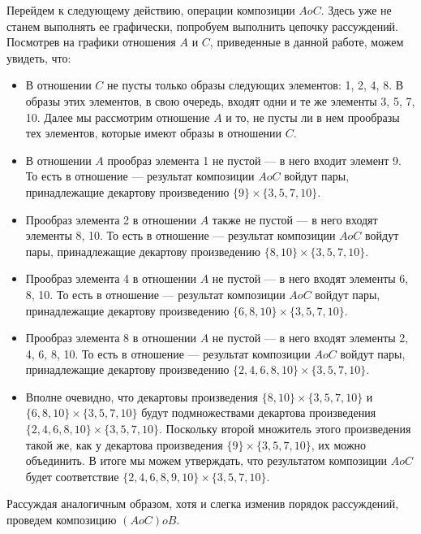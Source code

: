 \documentclass[12pt]{article}
\begin{document}
	Перейдем к следующему действию, операции композиции $A o C$. Здесь уже не станем выполнять ее графически, попробуем выполнить цепочку рассуждений. Посмотрев на графики отношения $A$ и $C$, приведенные в данной работе, можем увидеть, что:
	\begin{itemize}
		\item{В отношении $C$ не пусты только образы следующих элементов: 1, 2, 4, 8. В образы этих элементов, в свою очередь, входят одни и те же элементы 3, 5, 7, 10. Далее мы рассмотрим отношение $A$ и то, не пусты ли в нем прообразы тех элементов, которые имеют образы в отношении  $C$.}
		\item{В отношении $A$ прообраз элемента 1 не пустой --- в него входит элемент 9. То есть в отношение --- результат композиции $A o C$ войдут пары, принадлежащие декартову произведению $\{9\} \times \{3, 5, 7, 10\}$.}
		\item{Прообраз элемента 2 в отношении $A$ также не пустой --- в него входят элементы 8, 10. То есть в отношение --- результат композиции $A o C$ войдут пары, принадлежащие декартову произведению $\{8, 10\} \times \{3, 5, 7, 10\}$.}
		\item{Прообраз элемента 4 в отношении $A$ не пустой --- в него входят элементы 6, 8, 10. То есть в отношение --- результат композиции $A o C$ войдут пары, принадлежащие декартову произведению $\{6, 8, 10\} \times \{3, 5, 7, 10\}$.}
		\item{Прообраз элемента 8 в отношении $A$ не пустой --- в него входят элементы 2, 4, 6, 8, 10. То есть в отношение --- результат композиции $A o C$ войдут пары, принадлежащие декартову произведению $\{2, 4, 6, 8, 10\} \times \{3, 5, 7, 10\}$.}
		\item{Вполне очевидно, что декартовы произведения $\{8, 10\} \times \{3, 5, 7, 10\}$ и $\{6, 8, 10\} \times \{3, 5, 7, 10\}$ будут подмножествами декартова произведения $\{2, 4, 6, 8, 10\} \times \{3, 5, 7, 10\}$. Поскольку второй множитель этого произведения такой же, как у декартова произведения $\{9\} \times \{3, 5, 7, 10\}$, их можно объединить. В итоге мы можем утверждать, что результатом композиции $A o C$ будет соответствие $\{2, 4, 6, 8, 9, 10\} \times \{3, 5, 7, 10\}$.}
	\end{itemize}
	Рассуждая аналогичным образом, хотя и слегка изменив порядок рассуждений, проведем композицию $(A o C) o B$.
\end{document}

